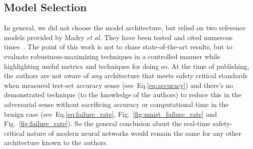 \documentclass[journal]{IEEEtran}
\begin{document}
\subsection{Model Selection}
In general, we did not choose the model architecture, but relied on two reference models provided by Madry \textit{et al.}
They have been tested and cited numerous times~\cite{madry2017towards}.
The point of this work is not to chase state-of-the-art results, but to evaluate robustness-maximizing techniques in a controlled manner while highlighting useful metrics and techniques for doing so.
At the time of publishing, the authors are not aware of \textit{any} architecture that meets safety critical standards when measured test-set accuracy sense (see~Eq.\ref{eq:accuracy}) and there's no demonstrated technique (to the knowledge of the authors) to reduce this in the adversarial sense without sacrificing accuracy or computational time in the benign case (see~Eq.\ref{eq:failure_rate}, Fig.~\ref{fig:mnist_failure_rate} and Fig.~\ref{fig:failure_rate}).
So the general conclusion about the real-time safety-critical nature of modern neural networks would remain the same for any other architecture known to the authors.
\end{document}
